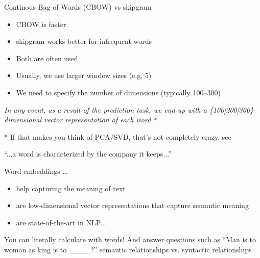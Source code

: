 \begin{frame}{Continous Bag of Words (CBOW) vs skipgram}
  \begin{itemize}
  \item CBOW is faster
  \item skipgram works better for infrequent words
  \item Both are often used
  \item Usually, we use larger window sizes (e.g, 5)
  \item We need to specify the number of dimensions (typically 100--300)
  \end{itemize}
  \pause
  
  \textit{In any event, as a result of the prediction task, we end up with a \{100|200|300\}-dimensional vector representation of each word.*}
  
  
  \tiny{* If that makes you think of PCA/SVD, that's not completely crazy, see \cite{Levy2018}}\\
\end{frame}




\begin{frame}{``...a word is characterized by the company it keeps...''\cite{Firth1957}}
  \begin{block}{Word embeddings \ldots}
    \begin{itemize}
    \item help capturing the meaning of text
    \item are low-dimensional vector representations that capture semantic meaning
    \item are state-of-the-art in NLP...
    \end{itemize}
  \end{block}

\end{frame}



\begin{frame}{You can literally calculate with words!}
	And answer questions such as ``Man is to woman as king is to \_\_\_\_?''
	semantic relationships vs. syntactic relationships
\end{frame}

